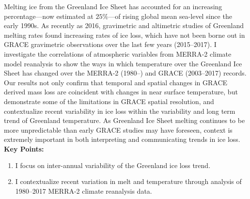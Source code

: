 

Melting ice from the Greenland Ice Sheet has accounted for an increasing percentage---now estimated at $25\%$---of rising global mean sea-level since the early 1990s. As recently as 2016, gravimetric and altimetric studies of Greenland melting rates found increasing rates of ice loss, which have not been borne out in GRACE gravimetric observations over the last few years (2015--2017). I investigate the correlations of atmospheric variables from MERRA-2 climate model reanalysis to show the ways in which temperature over the Greenland Ice Sheet has changed over the MERRA-2 (1980--) and GRACE (2003--2017) records. Our results not only confirm that temporal and spatial changes in GRACE derived mass loss are coincident with changes in near surface temperature, but demonstrate some of the limitations in GRACE spatial resolution, and contextualize recent variability in ice loss within the variability and long term trend of Greenland temperature. As Greenland Ice Sheet melting continues to be more unpredictable than early GRACE studies may have foreseen, context is extremely important in both interpreting and communicating trends in ice loss. \\[3em]

\textbf{Key Points:}
\begin{enumerate}
	\item I focus on inter-annual variability of the Greenland ice loss trend.
	\item I contextualize recent variation in melt and temperature through analysis of 1980--2017 MERRA-2 climate reanalysis data. 

\end{enumerate}
